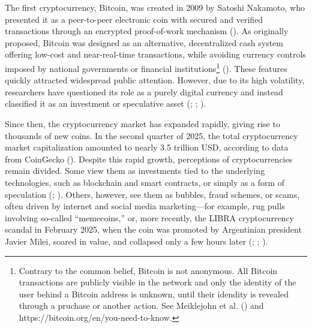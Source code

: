 \documentclass[
  12pt,
  a4paper,
  openany]{scrbook}
\begin{document}
The first cryptocurrency, Bitcoin, was created in 2009 by Satoshi
Nakamoto, who presented it as a peer-to-peer electronic coin with
secured and verified transactions through an encrypted proof-of-work
mechanism (). As
originally proposed, Bitcoin was designed as an alternative,
decentralized cash system offering low-cost and near-real-time
transactions, while avoiding currency controls imposed by national
governments or financial institutions\footnote{Contrary to the common
  belief, Bitcoin is not anonymous. All Bitcoin transactions are
  publicly visible in the network and only the identity of the user
  behind a Bitcoin address is unknown, until their idendity is revealed
  through a pruchase or another action. See Meiklejohn et al.
  () and
  https://bitcoin.org/en/you-need-to-know.}
(). These features
quickly attracted widespread public attention. However, due to its high
volatility, researchers have questioned its role as a purely digital
currency and instead classified it as an investment or speculative asset
(;
;
).

Since then, the cryptocurrency market has expanded rapidly, giving rise
to thousands of new coins. In the second quarter of 2025, the total
cryptocurrency market capitalization amounted to nearly 3.5 trillion
USD, according to data from CoinGecko
(). Despite this rapid growth,
perceptions of cryptocurrencies remain divided. Some view them as
investments tied to the underlying technologies, such as blockchain and
smart contracts, or simply as a form of speculation
(;
).
Others, however, see them as bubbles, fraud schemes, or scams, often
driven by internet and social media marketing---for example, rug pulls
involving so-called ``memecoins,'' or, more recently, the LIBRA
cryptocurrency scandal in February 2025, when the coin was promoted by
Argentinian president Javier Milei, soared in value, and collapsed only
a few hours later (; ; ).
\end{document}
